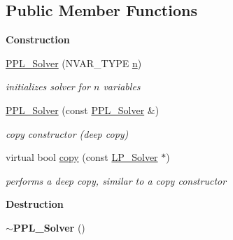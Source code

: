 \subsection*{Public Member Functions}
\begin{Indent}\textbf{ Construction}\par
\begin{DoxyCompactItemize}
\item 
\mbox{\label{class_p_p_l___solver_a7484421e15572f77d014b2feb9d79f04}} 
\hyperlink{class_p_p_l___solver_a7484421e15572f77d014b2feb9d79f04}{P\+P\+L\+\_\+\+Solver} (N\+V\+A\+R\+\_\+\+T\+Y\+PE \hyperlink{class_p_p_l___solver_aa70891def9af366c47e01acf952bbdba}{n})
\begin{DoxyCompactList}\small\item\em initializes solver for $ n $ variables \end{DoxyCompactList}\item 
\mbox{\label{class_p_p_l___solver_a7aa1c2c02e059f35f9d9faca9e94f859}} 
\hyperlink{class_p_p_l___solver_a7aa1c2c02e059f35f9d9faca9e94f859}{P\+P\+L\+\_\+\+Solver} (const \hyperlink{class_p_p_l___solver}{P\+P\+L\+\_\+\+Solver} \&)
\begin{DoxyCompactList}\small\item\em copy constructor (deep copy) \end{DoxyCompactList}\item 
virtual bool \hyperlink{class_p_p_l___solver_a67408174d2260de5ae5f070a70f27e9d}{copy} (const \hyperlink{class_l_p___solver}{L\+P\+\_\+\+Solver} $\ast$)
\begin{DoxyCompactList}\small\item\em performs a deep copy, similar to a copy constructor \end{DoxyCompactList}\end{DoxyCompactItemize}
\end{Indent}
\begin{Indent}\textbf{ Destruction}\par
\begin{DoxyCompactItemize}
\item 
\mbox{\label{class_p_p_l___solver_aecb2caed09777ca3b6d5e285540abe56}} 
{\bfseries $\sim$\+P\+P\+L\+\_\+\+Solver} ()
\end{DoxyCompactItemize}
\end{Indent}
